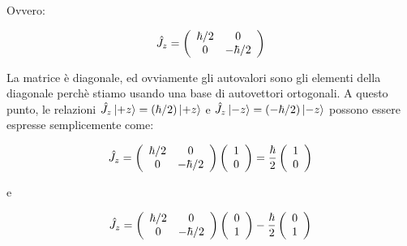 Ovvero:
	
	\begin{equation}
		\hat{J}_z = 
			\left( \begin{array}{c c}
				\hbar / 2 & 0 \\
				0 &  - \hbar / 2 \\ 
			\end{array}
		\right )
	\end{equation}

La matrice \`e diagonale, ed ovviamente gli autovalori sono gli elementi della diagonale perch\`e stiamo usando una base di autovettori ortogonali. A questo punto, le relazioni $\hat{J}_z \ket{+z} = (\hbar / 2) \ket{+z}$ e $\hat{J}_z \ket{-z} = (- \hbar / 2) \ket{-z}$ possono essere espresse semplicemente come:

	\begin{equation}
		\hat{J}_z = 
		\left( \begin{array}{c c}
				\hbar / 2 & 0 \\
				0 &  - \hbar / 2 \\ 
			\end{array}
		\right )
		\left( \begin{array}{c}
				1 \\
				0 \\
			\end{array}
		\right ) = \frac{\hbar}{2} \left( \begin{array}{c}
				1 \\
				0 \\
			\end{array}
		\right )
	\end{equation}

e

	\begin{equation}
		\hat{J}_z = 
		\left( \begin{array}{c c}
				\hbar / 2 & 0 \\
				0 &  - \hbar / 2 \\ 
			\end{array}
		\right )
		\left( \begin{array}{c}
				0 \\
				1 \\
			\end{array}
		\right ) -\frac{\hbar}{2} \left( \begin{array}{c}
				0 \\
				1 \\
			\end{array}
		\right ) 
	\end{equation}

